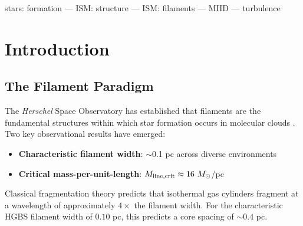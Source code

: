 \documentclass[11pt,a4paper]{article}
\begin{document}
\begin{abstract}
We also perform 3,240 simulations across the physical parameter space of finite-length effects, external pressure, magnetic fields, non-cylindrical geometry, and mass accretion, demonstrating that plausible combinations of these effects can explain the observed spacing range. Self-gravitating MHD simulations show that core spacing becomes independent of magnetic field strength in the highly supercritical regime ($f = 6.6$), with $\lambda/W \approx 0.94$, while the observed spacing ($\lambda/W \approx 2.1$) lies between the near-critical IM92 prediction ($\lambda/W \approx 4$) and the highly supercritical limit, suggesting real filaments are moderately supercritical ($f \approx 2$--$3$).

Together, these analyses provide strong evidence that magnetic tension---acting on moderately supercritical filaments with longitudinal field geometry---plays a crucial role in setting the sub-Jeans core spacing observed in molecular cloud filaments.
\end{abstract}

stars: formation --- ISM: structure --- ISM: filaments --- MHD --- turbulence

\section{Introduction}

\subsection{The Filament Paradigm}

The \textit{Herschel} Space Observatory has established that filaments are the fundamental structures within which star formation occurs in molecular clouds \citep{Andre2010}. Two key observational results have emerged:

\begin{itemize}
    \item \textbf{Characteristic filament width}: $\sim$0.1 pc across diverse environments \citep{Arzoumanian2011}
    \item \textbf{Critical mass-per-unit-length}: $M_{\rm line,crit} \approx 16~M_\odot$/pc \citep{Ostriker1964}
\end{itemize}

Classical fragmentation theory \citep{Inutsuka1992} predicts that isothermal gas cylinders fragment at a wavelength of approximately $4\times$ the filament width. For the characteristic HGBS filament width of $0.10$ pc, this predicts a core spacing of $\sim0.4$ pc.
\end{document}
